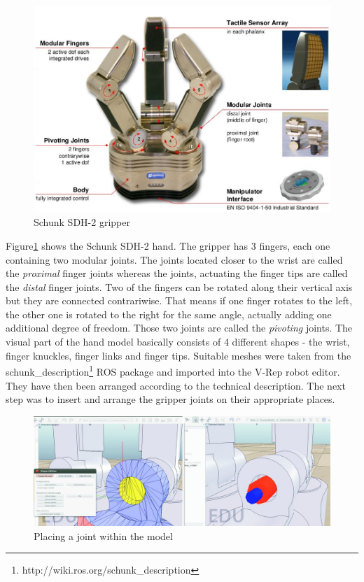 \begin{figure}[ht]
	\centering
  	\includegraphics[width=1.0\textwidth]{images/sdh_sheet.jpg}
	\caption{Schunk SDH-2 gripper}
	\label{fig:sdh_sheet}
\end{figure}
Figure\ref{fig:sdh_sheet} shows the Schunk SDH-2 hand. The gripper has 3 fingers, each one containing two modular joints. The joints located closer to the wrist are called the \emph{proximal} finger joints whereas the joints, actuating the finger tips are called the \emph{distal} finger joints. Two of the fingers can be rotated along their vertical axis but they are connected contrariwise. That means if one finger rotates to the left, the other one is rotated to the right for the same angle, actually adding one additional degree of freedom. Those two joints are called the \emph{pivoting} joints. The visual part of the hand model basically consists of 4 different shapes - the wrist, finger knuckles, finger links and finger tips. Suitable meshes were taken from the schunk\_description\footnote{http://wiki.ros.org/schunk\_description} ROS package and imported into the V-Rep robot editor. They have then been arranged according to the technical description. The next step was to insert and arrange the gripper joints on their appropriate places.
\begin{figure}[t]
	\centering
  	\includegraphics[width=1.0\textwidth]{images/place_joint.jpg}
	\caption{Placing a joint within the model}
	\label{fig:place_jnt}
\end{figure}
